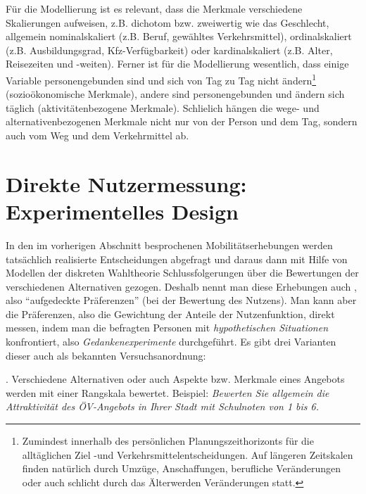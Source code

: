 F\"ur die Modellierung ist es relevant, dass die Merkmale verschiedene Skalierungen aufweisen,
z.B. dichotom bzw. zweiwertig wie das Ge\-schlecht, allgemein
nominalskaliert (z.B. Beruf, gew\"ahltes Verkehrsmittel),
ordinalskaliert (z.B. Ausbildungsgrad,
Kfz-Ver\-f\"ug\-bar\-keit) oder kardinalskaliert (z.B. Alter, Reisezeiten und
-weiten). Ferner ist f\"ur die Modellierung wesentlich, dass einige
Variable personengebunden  sind und sich von Tag zu Tag nicht 
\"andern\footnote{Zumindest innerhalb des pers\"onlichen Planungszeithorizonts f\"ur die
allt\"aglichen Ziel -und Verkehrsmittelentscheidungen. Auf l\"angeren Zeitskalen
finden nat\"urlich durch Umz\"uge, Anschaffungen, berufliche Ver\"anderungen oder auch
schlicht durch  das \"Alterwerden Ver\"anderungen statt.}
(sozio\"okonomische Merkmale), andere sind personengebunden und
\"andern sich t\"aglich (aktivit\"atenbezogene Merkmale). Schlie\3lich
h\"angen die wege- und alternativenbezogenen Merkmale nicht nur von
der Person und dem Tag, sondern auch vom Weg und dem Verkehrmittel ab.



\section{\label{sec:erh-nutzermessung}Direkte Nutzermessung:
  Experimentelles Design}

In den im vorherigen Abschnitt besprochenen
Mobilit\"atserhebungen werden tats\"achlich realisierte Entscheidungen
abgefragt und daraus dann mit Hilfe von Modellen der diskreten Wahltheorie
Schlussfolgerungen \"uber die Bewertungen der verschiedenen
Alternativen gezogen. Deshalb nennt man diese Erhebungen auch
, also ``aufge\-deck\-te Pr\"aferenzen'' (bei
der Bewertung des Nutzens). Man kann aber die Pr\"aferenzen, also
die Gewichtung der Anteile der Nutzenfunktion, direkt messen, indem
man die befragten Personen mit \emph{hypothetischen Situationen}
konfrontiert, also \emph{Gedankenexperimente} durch\-gef\"uhrt. Es gibt
drei Varianten dieser auch als  
bekannten Versuchsanordnung: 
\bi
\item[(a)] . Verschiedene Alternativen oder
auch Aspekte bzw. Merkmale eines Angebots
werden mit einer Rangskala bewertet. Beispiel: \textit{Bewerten Sie allgemein
die Attraktivit\"at des \"OV-Angebots in Ihrer Stadt mit Schulnoten
von 1 bis 6.}


